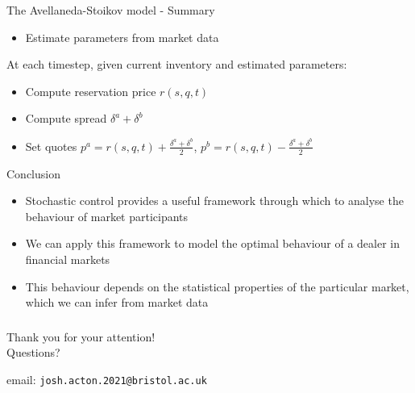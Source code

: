 \documentclass{beamer} %
\begin{document}
\begin{frame}{The Avellaneda-Stoikov model - Summary}
    \begin{itemize}
        \item Estimate parameters from market data
    \end{itemize}
    At each timestep, given current inventory and estimated parameters:
    \begin{itemize}
        \item Compute reservation price $r(s,q,t)$
        \item Compute spread $\delta^a+\delta^b$
        \item Set quotes $p^a=r(s,q,t)+\frac{\delta^a+\delta^b}{2}$, $p^b=r(s,q,t)-\frac{\delta^a+\delta^b}{2}$
    \end{itemize}
\end{frame}

\begin{frame}{Conclusion}
    \begin{itemize}
        \item Stochastic control provides a useful framework through which to analyse the behaviour of market participants
        \item We can apply this framework to model the optimal behaviour of a dealer in financial markets
        \item This behaviour depends on the statistical properties of the particular market, which we can infer from market data
    \end{itemize}
\end{frame}

\begin{frame}
    \frametitle{}
    \begin{center}
        \large{Thank you for your attention!}\\
        \vspace{1cm}
        Questions?
        \vspace{2cm}

        email: \texttt{josh.acton.2021@bristol.ac.uk}
    \end{center}
\end{frame}
\end{document}
